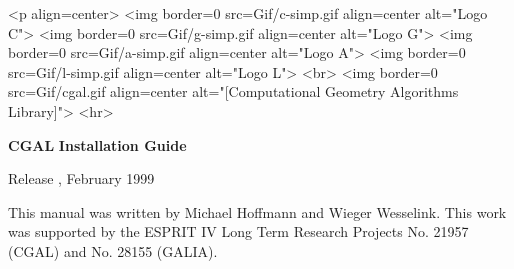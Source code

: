 
\pagestyle{empty}

\begin{titlepage}
  \mbox{} 
  \vspace{3cm}
  \ccTexHtml 
  {\centerline{
        }}
  {<p align=center>
    <img border=0 src=Gif/c-simp.gif align=center alt="Logo C">
    <img border=0 src=Gif/g-simp.gif align=center alt="Logo G">
    <img border=0 src=Gif/a-simp.gif align=center alt="Logo A">
    <img border=0 src=Gif/l-simp.gif align=center alt="Logo L">
    <br>
    <img border=0 src=Gif/cgal.gif align=center 
    alt="[Computational Geometry Algorithms Library]">
    <hr>}

  \vspace{2cm}
  \centerline{ {\Huge{\bf CGAL}} {\huge{\bf Installation Guide}} }
  
  \vspace{2cm}
  \newcommand{\mydate}{February 1999}
  \ccTexHtml
  {\renewcommand{\mydate}{\ifcase\the\month \or January\or
      February\or March\or April\or May\or June\or July\or August\or
      September\or October\or November\or December\fi \the\year}}{}
  \centerline{ {\large Release \cgalrelease, \mydate} }
\end{titlepage}

\mbox{} \vfill This manual was written by Michael Hoffmann and Wieger
Wesselink.  \vfill This work was supported by the ESPRIT IV Long Term
Research Projects No. 21957 (CGAL) and No. 28155 (GALIA).
\vspace{5cm}

\pagestyle{plain}
\setcounter{page}{0}
\cleardoublepage

